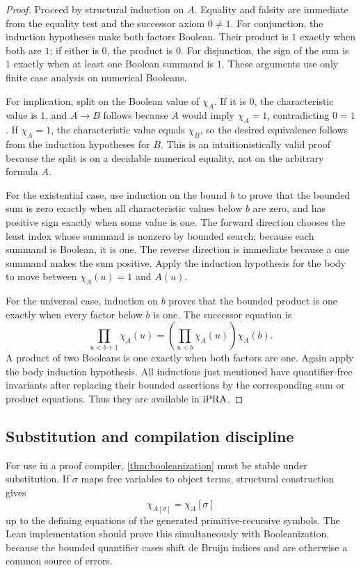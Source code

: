 \begin{proof}
Proceed by structural induction on \(A\).  Equality and falsity are immediate from the
equality test and the successor axiom \(0\ne1\).  For conjunction, the induction
hypotheses make both factors Boolean.  Their product is \(1\) exactly when both are
\(1\); if either is \(0\), the product is \(0\).  For disjunction, the sign of the sum
is \(1\) exactly when at least one Boolean summand is \(1\).  These arguments use only
finite case analysis on numerical Booleans.

For implication, split on the Boolean value of \(\chi_A\).  If it is \(0\), the
characteristic value is \(1\), and \(A\to B\) follows because \(A\) would imply
\(\chi_A=1\), contradicting \(0=1\).  If \(\chi_A=1\), the characteristic value equals
\(\chi_B\), so the desired equivalence follows from the induction hypotheses for
\(B\).  This is an intuitionistically valid proof because the split is on a decidable
numerical equality, not on the arbitrary formula \(A\).

For the existential case, use induction on the bound \(b\) to prove that the bounded
sum is zero exactly when all characteristic values below \(b\) are zero, and has
positive sign exactly when some value is one.  The forward direction chooses the least
index whose summand is nonzero by bounded search; because each summand is Boolean, it
is one.  The reverse direction is immediate because a one summand makes the sum
positive.  Apply the induction hypothesis for the body to move between
\(\chi_A(u)=1\) and \(A(u)\).

For the universal case, induction on \(b\) proves that the bounded product is one
exactly when every factor below \(b\) is one.  The successor equation is
\[
   \prod_{u<b+1}\chi_A(u)
   =\left(\prod_{u<b}\chi_A(u)\right)\chi_A(b).
\]
A product of two Booleans is one exactly when both factors are one.  Again apply the
body induction hypothesis.  All inductions just mentioned have quantifier-free
invariants after replacing their bounded assertions by the corresponding sum or
product equations.  Thus they are available in \(\mathrm{iPRA}\).
\end{proof}

\subsection{Substitution and compilation discipline}

For use in a proof compiler, \cref{thm:booleanization} must be stable under
substitution.  If \(\sigma\) maps free variables to object terms, structural
construction gives
\[
   \chi_{A[\sigma]}=\chi_A[\sigma]
\]
up to the defining equations of the generated primitive-recursive symbols.  The Lean
implementation should prove this simultaneously with Booleanization, because the
bounded quantifier cases shift de Bruijn indices and are otherwise a common source of
errors.

